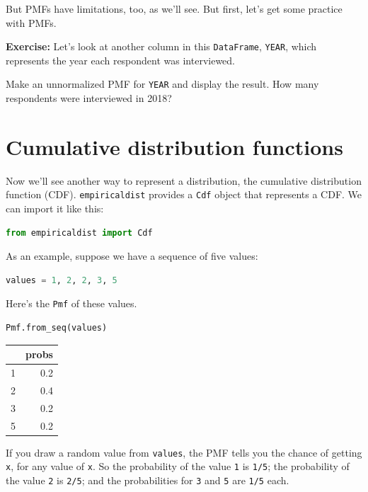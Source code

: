 But PMFs have limitations, too, as we'll see. But first, let's get some
practice with PMFs.

\textbf{Exercise:} Let's look at another column in this
\passthrough{\lstinline!DataFrame!}, \passthrough{\lstinline!YEAR!},
which represents the year each respondent was interviewed.

Make an unnormalized PMF for \passthrough{\lstinline!YEAR!} and display
the result. How many respondents were interviewed in 2018?

\hypertarget{cumulative-distribution-functions}{%
\section{Cumulative distribution
functions}\label{cumulative-distribution-functions}}

Now we'll see another way to represent a distribution, the cumulative
distribution function (CDF). \passthrough{\lstinline!empiricaldist!}
provides a \passthrough{\lstinline!Cdf!} object that represents a CDF.
We can import it like this:

\begin{lstlisting}[language=Python]
from empiricaldist import Cdf
\end{lstlisting}

As an example, suppose we have a sequence of five values:

\begin{lstlisting}[language=Python]
values = 1, 2, 2, 3, 5  
\end{lstlisting}

Here's the \passthrough{\lstinline!Pmf!} of these values.

\begin{lstlisting}[language=Python]
Pmf.from_seq(values)
\end{lstlisting}

\begin{tabular}{lr}
\toprule
{} &  probs \\
\midrule
1 &    0.2 \\
2 &    0.4 \\
3 &    0.2 \\
5 &    0.2 \\
\bottomrule
\end{tabular}

If you draw a random value from \passthrough{\lstinline!values!}, the
PMF tells you the chance of getting \passthrough{\lstinline!x!}, for any
value of \passthrough{\lstinline!x!}. So the probability of the value
\passthrough{\lstinline!1!} is \passthrough{\lstinline!1/5!}; the
probability of the value \passthrough{\lstinline!2!} is
\passthrough{\lstinline!2/5!}; and the probabilities for
\passthrough{\lstinline!3!} and \passthrough{\lstinline!5!} are
\passthrough{\lstinline!1/5!} each.

